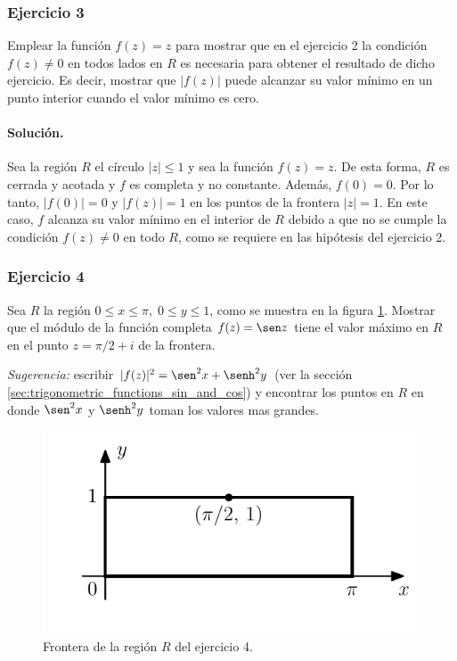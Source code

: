 \documentclass[a4paper]{report}
\begin{document}
\subsubsection{Ejercicio 3}

Emplear la función \(f(z)=z\) para mostrar que en el ejercicio 2 la condición \(f(z)\neq0\) en todos lados en \(R\) es necesaria para obtener el resultado de dicho ejercicio. Es decir, mostrar que \(|f(z)|\) puede alcanzar su valor mínimo en un punto interior cuando el valor mínimo es cero. 

\paragraph{Solución.} Sea la región \(R\) el círculo \(|z|\leq1\) y sea la función \(f(z)=z\). De esta forma, \(R\) es cerrada y acotada y \(f\) es completa y no constante. Además, \(f(0)=0\). Por lo tanto, \(|f(0)|=0\) y \(|f(z)|=1\) en los puntos de la frontera \(|z|=1\). En este caso, \(f\) alcanza su valor mínimo en el interior de \(R\) debido a que no se cumple la condición \(f(z)\neq0\) en todo \(R\), como se requiere en las hipótesis del ejercicio 2.

\subsubsection{Ejercicio 4}

Sea \(R\) la región \(0\leq x\leq\pi,\;0\leq y\leq1\), como se muestra en la figura \ref{fig:exercise_59_04_R}. Mostrar que el módulo de la función completa \(f(z)=\sen z\) tiene el valor máximo en \(R\) en el punto \(z=\pi/2+i\) de la frontera.

\emph{Sugerencia:} escribir \(|f(z)|^2=\sen^2x+\senh^2y\) (ver la sección \ref{sec:trigonometric_functions_sin_and_cos}) y encontrar los puntos en \(R\) en donde \(\sen^2x\) y \(\senh^2y\) toman los valores mas grandes.
\begin{figure}[!htb]
  \begin{minipage}[c]{0.42\textwidth}
    \includegraphics[width=\textwidth]{figuras/exercise_59_04_R.pdf}
  \end{minipage}\hfill
  \begin{minipage}[c]{0.48\textwidth}
    \caption{
       Frontera de la región \(R\) del ejercicio 4.
    }\label{fig:exercise_59_04_R}
  \end{minipage}
\end{figure}
\end{document}
